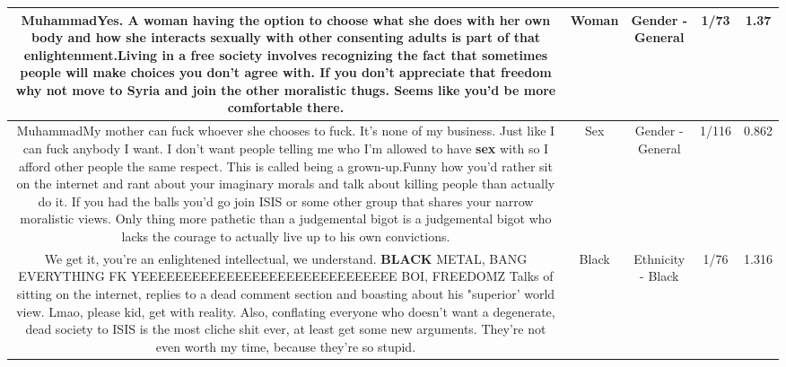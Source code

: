 \documentclass[11pt]{article}
\newlength\mylength
\begin{document}
\begin{center}
\begin{longtable}{|C{.65\mylength}|C{.30\mylength}|C{.12\mylength}|C{.12\mylength}|C{.12\mylength}|}
  \small MuhammadYes. A \textbf{woman} having the option to choose what she does with her own body and how she interacts sexually with other consenting adults is part of that enlightenment.Living in a free society involves recognizing the fact that sometimes people will make choices you don't agree with. If you don't appreciate that freedom why not move to Syria and join the other moralistic thugs. Seems like you'd be more comfortable there.\normalsize   & Woman & Gender - General & 1/73 & 1.37 \\  \hline
  \small MuhammadMy mother can fuck whoever she chooses to fuck. It's none of my business. Just like I can fuck anybody I want. I don't want people telling me who I'm allowed to have \textbf{sex} with so I afford other people the same respect. This is called being a grown-up.Funny how you'd rather sit on the internet and rant about your imaginary morals and talk about killing people than actually do it. If you had the balls you'd go join ISIS or some other group that shares your narrow moralistic views. Only thing more pathetic than a judgemental bigot is a judgemental bigot who lacks the courage to actually live up to his own convictions.\normalsize   & Sex & Gender - General & 1/116 & 0.862 \\  \hline
  \small We get it, you're an enlightened intellectual, we understand. \textbf{BLACK} METAL, BANG EVERYTHING FK YEEEEEEEEEEEEEEEEEEEEEEEEEEEEEE BOI, FREEDOMZ Talks of sitting on the internet, replies to a dead comment section and boasting about his "superior' world view. Lmao, please kid, get with reality. Also, conflating everyone who doesn't want a degenerate, dead society to ISIS is the most cliche shit ever, at least get some new arguments. They're not even worth my time, because they're so stupid.\normalsize   & Black & Ethnicity - Black & 1/76 & 1.316 \\  \hline

\end{longtable}
\end{center}
\end{document}
